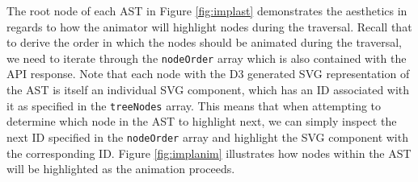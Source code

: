 \documentclass{l4proj}
\begin{document}
The root node of each AST in Figure \ref{fig:implast} demonstrates the aesthetics in regards to how the animator will highlight nodes during the traversal. Recall that to derive the order in which the nodes should be animated during the traversal, we need to iterate through the \texttt{nodeOrder} array which is also contained with the API response. Note that each node with the D3 generated SVG representation of the AST is itself an individual SVG component, which has an ID associated with it as specified in the \texttt{treeNodes} array. This means that when attempting to determine which node in the AST to highlight next, we can simply inspect the next ID specified in the \texttt{nodeOrder} array and highlight the SVG component with the corresponding ID. Figure \ref{fig:implanim} illustrates how nodes within the AST will be highlighted as the animation proceeds.
\end{document}
